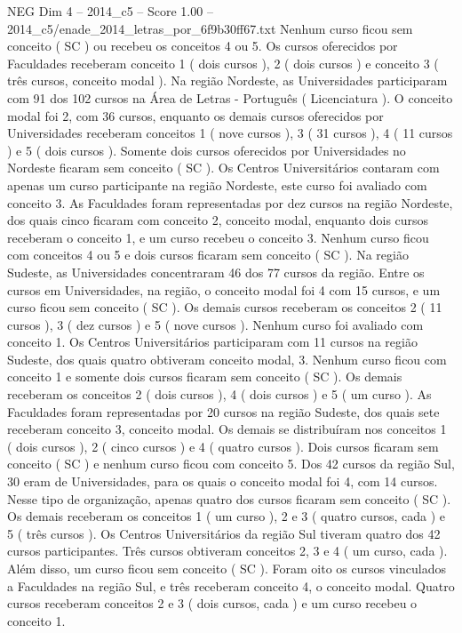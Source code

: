 \begin{textsample}{NEG Dim 4 – 2014\_c5 – Score 1.00 – 2014\_c5/enade\_2014\_letras\_por\_6f9b30ff67.txt}
Nenhum curso ficou sem conceito ( SC ) ou recebeu os conceitos 4 ou 5.
Os cursos oferecidos por Faculdades receberam conceito 1 ( dois cursos ), 2 ( dois cursos ) e conceito 3 ( três cursos, conceito modal ).
Na região Nordeste, as Universidades participaram com 91 dos 102 cursos na Área de Letras - Português ( Licenciatura ).
O conceito modal foi 2, com 36 cursos, enquanto os demais cursos oferecidos por Universidades receberam conceitos 1 ( nove cursos ), 3 ( 31 cursos ), 4 ( 11 cursos ) e 5 ( dois cursos ).
Somente dois cursos oferecidos por Universidades no Nordeste ficaram sem conceito ( SC ).
Os Centros Universitários contaram com apenas um curso participante na região Nordeste, este curso foi avaliado com conceito 3.
As Faculdades foram representadas por dez cursos na região Nordeste, dos quais cinco ficaram com conceito 2, conceito modal, enquanto dois cursos receberam o conceito 1, e um curso recebeu o conceito 3.
Nenhum curso ficou com conceitos 4 ou 5 e dois cursos ficaram sem conceito ( SC ).
Na região Sudeste, as Universidades concentraram 46 dos 77 cursos da região.
Entre os cursos em Universidades, na região, o conceito modal foi 4 com 15 cursos, e um curso ficou sem conceito ( SC ).
Os demais cursos receberam os conceitos 2 ( 11 cursos ), 3 ( dez cursos ) e 5 ( nove cursos ).
Nenhum curso foi avaliado com conceito 1.
Os Centros Universitários participaram com 11 cursos na região Sudeste, dos quais quatro obtiveram conceito modal, 3.
Nenhum curso ficou com conceito 1 e somente dois cursos ficaram sem conceito ( SC ).
Os demais receberam os conceitos 2 ( dois cursos ), 4 ( dois cursos ) e 5 ( um curso ).
As Faculdades foram representadas por 20 cursos na região Sudeste, dos quais sete receberam conceito 3, conceito modal.
Os demais se distribuíram nos conceitos 1 ( dois cursos ), 2 ( cinco cursos ) e 4 ( quatro cursos ).
Dois cursos ficaram sem conceito ( SC ) e nenhum curso ficou com conceito 5.
Dos 42 cursos da região Sul, 30 eram de Universidades, para os quais o conceito modal foi 4, com 14 cursos.
Nesse tipo de organização, apenas quatro dos cursos ficaram sem conceito ( SC ).
Os demais receberam os conceitos 1 ( um curso ), 2 e 3 ( quatro cursos, cada ) e 5 ( três cursos ).
Os Centros Universitários da região Sul tiveram quatro dos 42 cursos participantes.
Três cursos obtiveram conceitos 2, 3 e 4 ( um curso, cada ).
Além disso, um curso ficou sem conceito ( SC ).
Foram oito os cursos vinculados a Faculdades na região Sul, e três receberam conceito 4, o conceito modal.
Quatro cursos receberam conceitos 2 e 3 ( dois cursos, cada ) e um curso recebeu o conceito 1.

\end{textsample}
